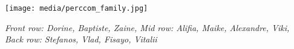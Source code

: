 \documentclass[10pt,a4paper]{article} %
\begin{document}
\begin{center}
	\vspace{10pt}
	\texttt{[image: media/perccom\_family.jpg]} %
	\vspace{10pt}
		\par\textit{Front row: Dorine, Baptiste, Zaine, Mid row: Alifia, Maike, Alexandre, Viki, Back row: Stefanos, Vlad, Fisayo, Vitalii}
\end{center}
\end{document}
